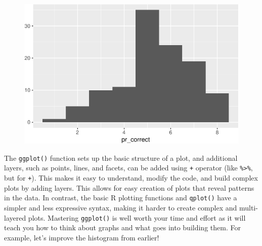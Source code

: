 \documentclass[
  letterpaper,
]{book}
\begin{document}
\begin{figure}[H]

{\centering \includegraphics{./data_viz_files/figure-pdf/unnamed-chunk-13-2.pdf}

}

\end{figure}

The \texttt{ggplot()} function sets up the basic structure of a plot,
and additional layers, such as points, lines, and facets, can be added
using \texttt{+} operator (like \texttt{\%\textgreater{}\%}, but for
\texttt{+}). This makes it easy to understand, modify the code, and
build complex plots by adding layers. This allows for easy creation of
plots that reveal patterns in the data. In contrast, the basic R
plotting functions and \texttt{qplot()} have a simpler and less
expressive syntax, making it harder to create complex and multi-layered
plots. Mastering \texttt{ggplot()} is well worth your time and effort as
it will teach you how to think about graphs and what goes into building
them. For example, let's improve the histogram from earlier!
\end{document}
